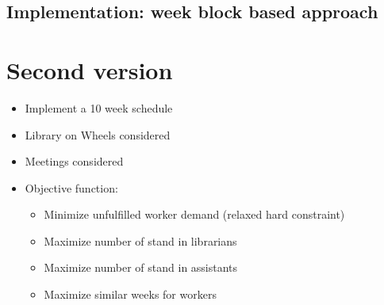 \documentclass{article}
\begin{document}
	
	\subsection*{Implementation: week block based approach} 

	

	
	\section*{Second version }
	\begin{itemize}
		\item Implement a 10 week schedule
		\item Library on Wheels considered
		\item Meetings considered
		\item Objective function:
				\begin{itemize}
				\item Minimize unfulfilled worker demand (relaxed hard constraint)
				\item Maximize number of stand in librarians
				\item Maximize number of stand in assistants
				\item Maximize similar weeks for workers
				\end{itemize}
				
	\end{itemize}
	
	
\end{document}
